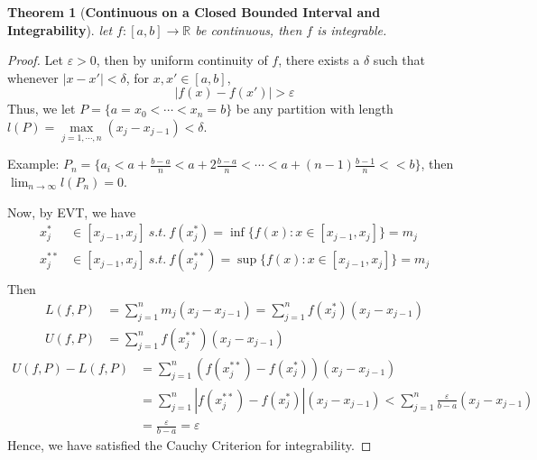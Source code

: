 \documentclass[12pt]{article}
\theoremstyle{plain}
\newtheorem{theorem}{Theorem}[subsection]
\newcommand{\abs}[1]{\left| #1 \right|}
\newcommand{\ep}{\varepsilon}
\begin{document}
	\begin{theorem}[\textbf{Continuous on a Closed Bounded Interval and 
		Integrability}]
		let $f:[a,b]\to\mathbb{R}$ be continuous, then $f$ is integrable. 
	\end{theorem}
	\begin{proof}
		Let $\ep>0$, then by uniform continuity of $f$, there exists a $\delta$
		such that whenever $\abs{x-x'}<\delta$, for $x, x'\in[a,b]$, 
		\[
			\abs{f(x)-f(x')}>\ep
		\]
		Thus, we let $P=\{a=x_0<\cdots<x_n = b\}$ be any partition with length
		$l(P) = \underset{j=1,\cdots, n}{\max} (x_{j}-x_{j-1})<\delta$.  
		
		\textcolor{Periwinkle}
		{Example: $P_n = \{a_i<a+\frac{b-a}n<a+2\frac{b-a}n
		<\cdots<a+(n-1)\frac{b-1}n<<b\}$, then $\lim_{n\to\infty} l(P_n)=0$}.

		Now, by EVT, we have 
		\begin{align*}
			x^*_j &\in [x_{j-1}, x_j] \ s.t. \ 
			f(x^*_j)=\inf\{f(x):x\in [x_{j-1},x_j]\} = m_j\\
			x^{**}_j &\in [x_{j-1}, x_j] \ s.t. \ 
			f(x^{**}_j)=\sup\{f(x):x\in [x_{j-1},x_j]\} = m_j\\
		\end{align*}
		Then 
		\begin{align*}
			L(f,P) &= \sum_{j=1}^n m_j (x_j-x_{j-1}) = \sum_{j=1}^n f(x_j^*)
			(x_j-x_{j-1})\\
			U(f,P) &= \sum_{j=1}^n f(x_j^{**})(x_j-x_{j-1})
		\end{align*}
		\begin{align*}
			U(f,P)-L(f,P)
			&= \sum_{j=1}^n (f(x^{**}_j)-f(x_j^*))(x_j-x_{j-1})\\
			&=\sum_{j=1}^n \abs{f(x_j^{**})-f(x^*_j)}(x_j-x_{j-1})
				<\sum_{j=1}^n \frac{\ep}{b-a}(x_j-x_{j-1}) \\
			&=\frac{\ep}{b-a}=\ep
		\end{align*}
		Hence, we have satisfied the Cauchy Criterion for integrability. 
	\end{proof}
\end{document}

